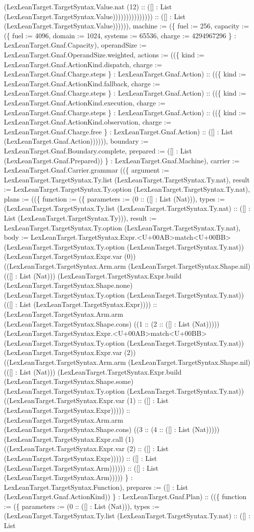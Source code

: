 \documentclass[11pt]{article}
\begin{document}
(LexLeanTarget.TargetSyntax.Value.nat (12) :: ([] : List (LexLeanTarget.TargetSyntax.Value))))))))))))))) :: ([] : List (LexLeanTarget.TargetSyntax.Value)))))), machine := (\{ fuel := 256, capacity := (\{ fuel := 4096, domain := 1024, systems := 65536, charge := 4294967296 \} : LexLeanTarget.Gnaf.Capacity), operandSize := LexLeanTarget.Gnaf.OperandSize.weighted, actions := ((\{ kind := LexLeanTarget.Gnaf.ActionKind.dispatch, charge := LexLeanTarget.Gnaf.Charge.steps \} : LexLeanTarget.Gnaf.Action) :: ((\{ kind := LexLeanTarget.Gnaf.ActionKind.fallback, charge := LexLeanTarget.Gnaf.Charge.steps \} : LexLeanTarget.Gnaf.Action) :: ((\{ kind := LexLeanTarget.Gnaf.ActionKind.execution, charge := LexLeanTarget.Gnaf.Charge.steps \} : LexLeanTarget.Gnaf.Action) :: ((\{ kind := LexLeanTarget.Gnaf.ActionKind.observation, charge := LexLeanTarget.Gnaf.Charge.free \} : LexLeanTarget.Gnaf.Action) :: ([] : List (LexLeanTarget.Gnaf.Action)))))), boundary := LexLeanTarget.Gnaf.Boundary.complete, prepared := ([] : List (LexLeanTarget.Gnaf.Prepared)) \} : LexLeanTarget.Gnaf.Machine), carrier := LexLeanTarget.Gnaf.Carrier.grammar ((\{ argument := LexLeanTarget.TargetSyntax.Ty.list (LexLeanTarget.TargetSyntax.Ty.nat), result := LexLeanTarget.TargetSyntax.Ty.option (LexLeanTarget.TargetSyntax.Ty.nat), plans := ((\{ function := (\{ parameters := (0 :: ([] : List (Nat))), types := (LexLeanTarget.TargetSyntax.Ty.list (LexLeanTarget.TargetSyntax.Ty.nat) :: ([] : List (LexLeanTarget.TargetSyntax.Ty))), result := LexLeanTarget.TargetSyntax.Ty.option (LexLeanTarget.TargetSyntax.Ty.nat), body := LexLeanTarget.TargetSyntax.Expr.<U+00AB>match<U+00BB> (LexLeanTarget.TargetSyntax.Ty.option (LexLeanTarget.TargetSyntax.Ty.nat)) (LexLeanTarget.TargetSyntax.Expr.var (0)) ((LexLeanTarget.TargetSyntax.Arm.arm (LexLeanTarget.TargetSyntax.Shape.nil) (([] : List (Nat))) (LexLeanTarget.TargetSyntax.Expr.build (LexLeanTarget.TargetSyntax.Shape.none) (LexLeanTarget.TargetSyntax.Ty.option (LexLeanTarget.TargetSyntax.Ty.nat)) (([] : List (LexLeanTarget.TargetSyntax.Expr)))) :: (LexLeanTarget.TargetSyntax.Arm.arm (LexLeanTarget.TargetSyntax.Shape.cons) ((1 :: (2 :: ([] : List (Nat))))) (LexLeanTarget.TargetSyntax.Expr.<U+00AB>match<U+00BB> (LexLeanTarget.TargetSyntax.Ty.option (LexLeanTarget.TargetSyntax.Ty.nat)) (LexLeanTarget.TargetSyntax.Expr.var (2)) ((LexLeanTarget.TargetSyntax.Arm.arm (LexLeanTarget.TargetSyntax.Shape.nil) (([] : List (Nat))) (LexLeanTarget.TargetSyntax.Expr.build (LexLeanTarget.TargetSyntax.Shape.some) (LexLeanTarget.TargetSyntax.Ty.option (LexLeanTarget.TargetSyntax.Ty.nat)) ((LexLeanTarget.TargetSyntax.Expr.var (1) :: ([] : List (LexLeanTarget.TargetSyntax.Expr))))) :: (LexLeanTarget.TargetSyntax.Arm.arm (LexLeanTarget.TargetSyntax.Shape.cons) ((3 :: (4 :: ([] : List (Nat))))) (LexLeanTarget.TargetSyntax.Expr.call (1) ((LexLeanTarget.TargetSyntax.Expr.var (2) :: ([] : List (LexLeanTarget.TargetSyntax.Expr))))) :: ([] : List (LexLeanTarget.TargetSyntax.Arm)))))) :: ([] : List (LexLeanTarget.TargetSyntax.Arm))))) \} : LexLeanTarget.TargetSyntax.Function), prepares := ([] : List (LexLeanTarget.Gnaf.ActionKind)) \} : LexLeanTarget.Gnaf.Plan) :: ((\{ function := (\{ parameters := (0 :: ([] : List (Nat))), types := (LexLeanTarget.TargetSyntax.Ty.list (LexLeanTarget.TargetSyntax.Ty.nat) :: ([] : List 
\end{document}
